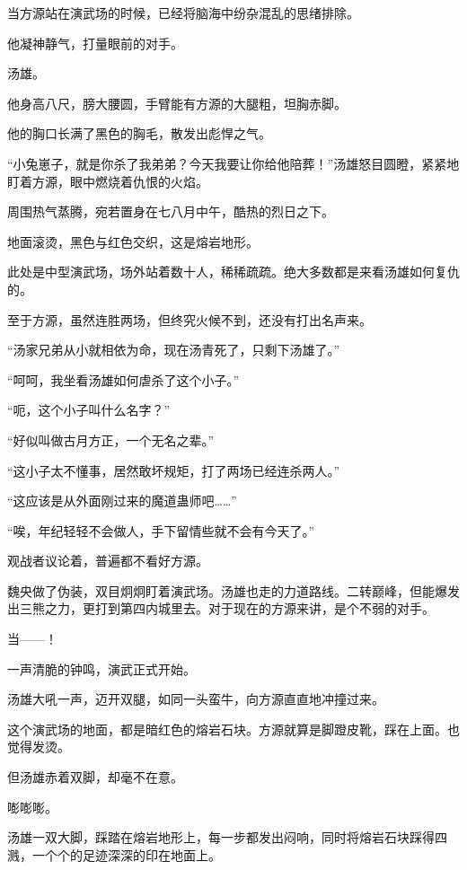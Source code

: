 
\begin{this_body}



当方源站在演武场的时候，已经将脑海中纷杂混乱的思绪排除。

他凝神静气，打量眼前的对手。

汤雄。

他身高八尺，膀大腰圆，手臂能有方源的大腿粗，坦胸赤脚。

他的胸口长满了黑色的胸毛，散发出彪悍之气。

“小兔崽子，就是你杀了我弟弟？今天我要让你给他陪葬！”汤雄怒目圆瞪，紧紧地盯着方源，眼中燃烧着仇恨的火焰。

周围热气蒸腾，宛若置身在七八月中午，酷热的烈日之下。

地面滚烫，黑色与红色交织，这是熔岩地形。

此处是中型演武场，场外站着数十人，稀稀疏疏。绝大多数都是来看汤雄如何复仇的。

至于方源，虽然连胜两场，但终究火候不到，还没有打出名声来。

“汤家兄弟从小就相依为命，现在汤青死了，只剩下汤雄了。”

“呵呵，我坐看汤雄如何虐杀了这个小子。”

“呃，这个小子叫什么名字？”

“好似叫做古月方正，一个无名之辈。”

“这小子太不懂事，居然敢坏规矩，打了两场已经连杀两人。”

“这应该是从外面刚过来的魔道蛊师吧……”

“唉，年纪轻轻不会做人，手下留情些就不会有今天了。”

观战者议论着，普遍都不看好方源。

魏央做了伪装，双目炯炯盯着演武场。汤雄也走的力道路线。二转巅峰，但能爆发出三熊之力，更打到第四内城里去。对于现在的方源来讲，是个不弱的对手。

当——！

一声清脆的钟鸣，演武正式开始。

汤雄大吼一声，迈开双腿，如同一头蛮牛，向方源直直地冲撞过来。

这个演武场的地面，都是暗红色的熔岩石块。方源就算是脚蹬皮靴，踩在上面。也觉得发烫。

但汤雄赤着双脚，却毫不在意。

嘭嘭嘭。

汤雄一双大脚，踩踏在熔岩地形上，每一步都发出闷响，同时将熔岩石块踩得四溅，一个个的足迹深深的印在地面上。


\end{this_body}
